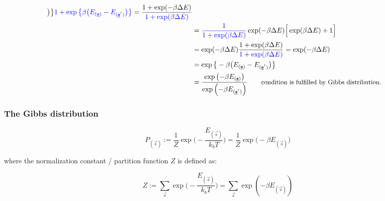 \begin{frame}{\subsecname}
\begin{align}
{		\big) \big\} }{{\color{blue}1 + \exp\big\{ \beta \big( E_{(\vec{s})} - 
		E_{(\vec{s}^{'})}\big) \big\} } }
	= \frac{1 + \exp( -\beta \Delta E)}{{\color{blue}1 + \exp( \beta \Delta E)}}  \\
	&= {\color{blue}\frac{1}{1+\exp(\beta \Delta E)}} \exp(-\beta \Delta E)
	\Big\lbrack \exp(\beta \Delta E) + 1\Big\rbrack\\
	&= \exp(-\beta \Delta E) \frac{1+\exp(\beta \Delta E)}{{\color{blue}1+\exp(\beta \Delta E)}}
	= \exp( - \beta \Delta E ) \\
	& = \exp\big\{ -\beta \big( E_{(\vec{s})} - E_{(\vec{s}^{'})}\big) \big\}\\
	&= \frac{\exp\left( -\beta E_{(\vec{s})}\right)}{\exp\left( -\beta  E_{(\vec{s}^{'})} \right)}
    \slidesonly{
    \qquad \small \text{condition is fulfilled by Gibbs distribution.}
    }
\end{align}

\end{frame}
\begin{frame}\frametitle{The Gibbs distribution}
\begin{equation}  \label{eq:gibbs}
P_{(\vec{s})} := \frac{1}{Z} \exp \Big(-\frac{E_{(\vec s)}}{k_b T}\Big) 
= \frac{1}{Z} \exp \Big(-\beta E_{(\vec s)} \Big) 
\end{equation}

where the normalization constant / partition function $Z$ is defined as:


\begin{equation} \label{eq:partition}
Z := \sum\limits_{\vec{s}} \exp \Big(-\frac{E_{(\vec s)}}{k_b T}\Big) = \sum\limits_{\vec{s}} \exp(-\beta E_{(\vec s)})
\end{equation}


\end{frame}

